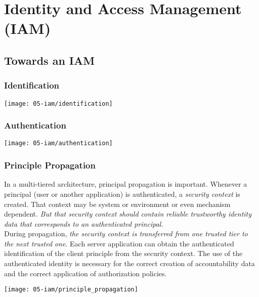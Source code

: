

\section{Identity and Access Management (IAM)}

\subsection{Towards an IAM}

\subsubsection{Identification}
\begin{center}
    \texttt{[image: 05-iam/identification]}
    \vspace{-8pt}
\end{center}

\subsubsection{Authentication}
\begin{center}
    \texttt{[image: 05-iam/authentication]}
    \vspace{-8pt}
\end{center}

\subsubsection{Principle Propagation}
\begin{minipage}{0.5\linewidth}
    In a multi-tiered architecture, principal propagation is important. Whenever a principal (user or another application) is authenticated, a \textit{security context} is created. That context may be system or environment or even mechanism dependent. \textit{But that security context should contain reliable trustworthy identity data that corresponds to an authenticated principal}.\\

    During propagation, \textit{the security context is transferred from one trusted tier to the next trusted one}. Each server application can obtain the authenticated identification of the client principle from the security context. The use of the authenticated identity is necessary for the correct creation of accountability data and the correct application of authorization policies.\\
\end{minipage}
\begin{minipage}{0.45\linewidth}
    \begin{center}
        \texttt{[image: 05-iam/principle\_propagation]}
        \vspace{-8pt}
    \end{center}
\end{minipage}

